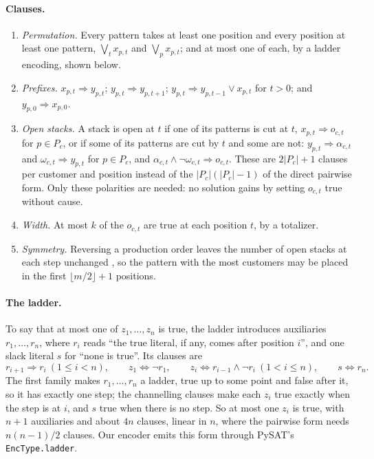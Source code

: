 \paragraph{Clauses.}
\begin{enumerate}
\item \emph{Permutation.} Every pattern takes at least one position and every
  position at least one pattern, $\bigvee_t x_{p,t}$ and $\bigvee_p x_{p,t}$;
    and at most one of each, by a ladder encoding, shown below.
\item \emph{Prefixes.} $x_{p,t}\Rightarrow y_{p,t}$;
  $y_{p,t}\Rightarrow y_{p,t+1}$; $y_{p,t}\Rightarrow y_{p,t-1}\vee x_{p,t}$
  for $t>0$; and $y_{p,0}\Rightarrow x_{p,0}$.
\item \emph{Open stacks.} A stack is open at $t$ if one of its patterns is cut
  at $t$, $x_{p,t}\Rightarrow o_{c,t}$ for $p\in P_c$, or if some of its
  patterns are cut by $t$ and some are not:
  $y_{p,t}\Rightarrow\alpha_{c,t}$ and $\omega_{c,t}\Rightarrow y_{p,t}$ for
  $p\in P_c$, and $\alpha_{c,t}\wedge\neg\omega_{c,t}\Rightarrow o_{c,t}$.
  These are $2|P_c|+1$ clauses per customer and position instead of the
  $|P_c|(|P_c|-1)$ of the direct pairwise form. Only these polarities are
  needed: no solution gains by setting $o_{c,t}$ true without cause.
\item \emph{Width.} At most $k$ of the $o_{c,t}$ are true at each position $t$,
  by a totalizer.
\item \emph{Symmetry.} Reversing a production order leaves the number of open
  stacks at each step unchanged \citep[Proposition~1]{Yanasse1997a}, so the
  pattern with the most customers may be placed in the first
  $\lfloor m/2\rfloor+1$ positions.
\end{enumerate}

\paragraph{The ladder.} To say that at most one of $z_1,\dots,z_n$ is true,
the ladder introduces auxiliaries $r_1,\dots,r_n$, where $r_i$ reads ``the true
literal, if any, comes after position $i$'', and one slack literal $s$ for
``none is true''. Its clauses are
\[
  r_{i+1}\Rightarrow r_i \ (1\le i<n),\qquad
  z_1\Leftrightarrow\neg r_1,\qquad
  z_i\Leftrightarrow r_{i-1}\wedge\neg r_i \ (1<i\le n),\qquad
  s\Leftrightarrow r_n .
\]
The first family makes $r_1,\dots,r_n$ a ladder, true up to some point and
false after it, so it has exactly one step; the channelling clauses make each
$z_i$ true exactly when the step is at $i$, and $s$ true when there is no step.
So at most one $z_i$ is true, with $n+1$ auxiliaries and about $4n$ clauses,
linear in $n$, where the pairwise form needs $n(n-1)/2$ clauses. Our encoder
emits this form through PySAT's \texttt{EncType.ladder}.

